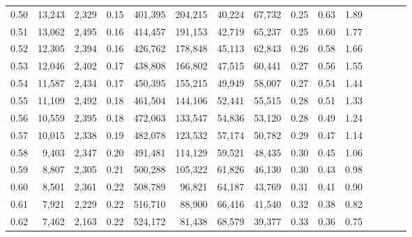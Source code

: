 \begin{tabular}{rrrcrrrrrrrrrrr}
0.50 &  13,243 &  2,329 &                                       0.15 &  401,395 &  204,215 &   40,224 &   67,732 &  0.25 &  0.63 &                         1.89 \\
0.51 &  13,062 &  2,495 &                                       0.16 &  414,457 &  191,153 &   42,719 &   65,237 &  0.25 &  0.60 &                         1.77 \\
0.52 &  12,305 &  2,394 &                                       0.16 &  426,762 &  178,848 &   45,113 &   62,843 &  0.26 &  0.58 &                         1.66 \\
0.53 &  12,046 &  2,402 &                                       0.17 &  438,808 &  166,802 &   47,515 &   60,441 &  0.27 &  0.56 &                         1.55 \\
0.54 &  11,587 &  2,434 &                                       0.17 &  450,395 &  155,215 &   49,949 &   58,007 &  0.27 &  0.54 &                         1.44 \\
0.55 &  11,109 &  2,492 &                                       0.18 &  461,504 &  144,106 &   52,441 &   55,515 &  0.28 &  0.51 &                         1.33 \\
0.56 &  10,559 &  2,395 &                                       0.18 &  472,063 &  133,547 &   54,836 &   53,120 &  0.28 &  0.49 &                         1.24 \\
0.57 &  10,015 &  2,338 &                                       0.19 &  482,078 &  123,532 &   57,174 &   50,782 &  0.29 &  0.47 &                         1.14 \\
0.58 &   9,403 &  2,347 &                                       0.20 &  491,481 &  114,129 &   59,521 &   48,435 &  0.30 &  0.45 &                         1.06 \\
0.59 &   8,807 &  2,305 &                                       0.21 &  500,288 &  105,322 &   61,826 &   46,130 &  0.30 &  0.43 &                         0.98 \\
0.60 &   8,501 &  2,361 &                                       0.22 &  508,789 &   96,821 &   64,187 &   43,769 &  0.31 &  0.41 &                         0.90 \\
0.61 &   7,921 &  2,229 &                                       0.22 &  516,710 &   88,900 &   66,416 &   41,540 &  0.32 &  0.38 &                         0.82 \\
0.62 &   7,462 &  2,163 &                                       0.22 &  524,172 &   81,438 &   68,579 &   39,377 &  0.33 &  0.36 &                         0.75 \\

\end{tabular}
